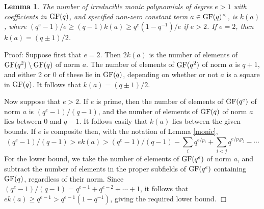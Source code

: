 \documentclass[12pt]{article}
\newtheorem{lemma}[definition]{Lemma}
\newenvironment{proof}{\normalsize {\sc Proof}:}{{\hfill $\Box$ \\}}
\def\GF{{\rm GF}}
\begin{document}
\begin{lemma}\label{monic-norm}
The number of irreducible monic polynomials of degree
$e>1$ with coefficients in $\GF(q)$, and specified non-zero constant
term $a\in\GF(q)^\times$, is $k(a)$, where
$(q^e-1)/e\ge(q-1)k(a)\ge q^e(1-q^{-1})/e$ if $e > 2$.
If $e = 2$, then $k(a) = (q \pm 1)/2$.
\end{lemma}
\begin{proof}
Suppose first that $e=2$.  Then $2k(a)$ is the number of elements of
$\GF(q^2)\setminus \GF(q)$ of norm $a$.  The number of elements of
$\GF(q^2)$ of norm $a$ is $q+1$, and either 2 or 0 of these lie in $\GF(q)$, 
depending on whether or not $a$ is a square in $\GF(q)$.  
It follows that $k(a)=(q\pm1)/2$.

Now suppose that $e>2$.  If $e$ is prime, then the number of elements of
$\GF(q^e)$ of norm $a$ is $(q^e-1)/(q-1)$, and the number of elements
of $\GF(q)$ of norm $a$ lies between 0 and $q-1$.  It follows easily that
$k(a)$ lies between the given bounds.  
If $e$ is composite then, with the notation
of Lemma \ref{monic}, 
$$(q^e-1)/(q-1)>ek(a)>(q^e-1)/(q-1)-
\sum_i q^{e/p_i}+\sum_{i<j}q^{e/p_ip_j}-\cdots$$
For the lower bound, we take the number of elements 
of $\GF(q^e)$ of norm $a$, and subtract the
number of elements in the proper subfields of 
$\GF(q^e)$ containing $\GF(q)$, regardless
of their norm.  
Since $(q^e-1)/(q-1) = q^{e-1}+q^{e-2}+\cdots+1$, it follows that
$ek(a)\ge q^{e-1}>q^{e-1}(1-q^{-1})$, giving the required lower bound. 
\end{proof}
\end{document}
